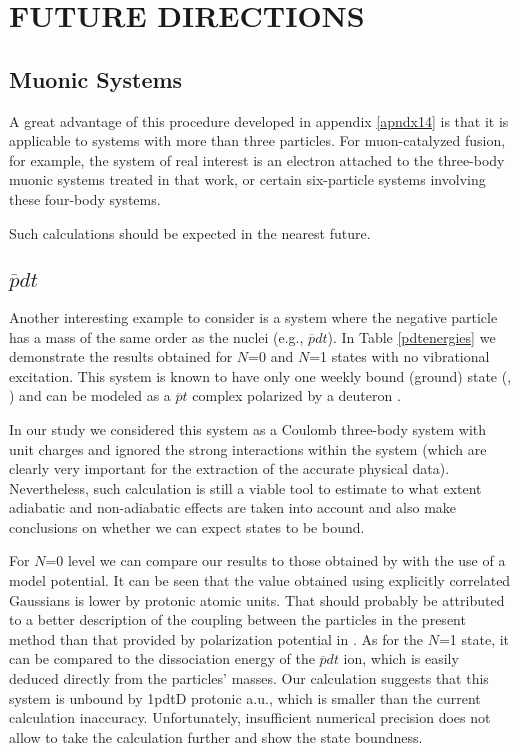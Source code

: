 \chapter{FUTURE DIRECTIONS\label{future}}

\section{Muonic Systems}

A great advantage of this procedure developed in appendix \ref{apndx14} 
is that it is applicable to systems with more than three particles. 
For muon-catalyzed fusion, 
for example, the system of real interest is an electron attached 
to the three-body muonic systems treated in that work, 
or certain six-particle systems involving these four-body systems.

Such calculations should be expected in the nearest future.

\section{$\overline{p}dt$}

Another interesting example to consider is a system where
the negative particle has a mass of the same order as the
nuclei (e.g., $\overline{p}dt$). In Table \ref{pdtenergies}
we demonstrate the results obtained for $N$=0 and $N$=1 
states with no vibrational excitation. This system is known
to have only one weekly bound (ground) state 
(\cite{pdt_N1_1}, \cite{pdt_N1_2}) and can be modeled as a
$\overline{p}t$ complex polarized by a deuteron \cite{frolov_pdt}.

In our study we considered this system as a Coulomb
three-body system with unit charges and ignored the 
strong interactions within the system (which are clearly
very important for the extraction of the accurate physical data).
Nevertheless, such calculation is still a viable tool
to estimate to what extent adiabatic and non-adiabatic effects
are taken into account and also make conclusions on 
whether we can expect states to be bound.
 
For $N$=0 level we can compare our results to those obtained
by \cite{frolov_pdt} with the use of a model potential.
It can be seen that the value obtained using explicitly 
correlated Gaussians is lower by \NpdtD  protonic atomic
units. That should probably be attributed to a better 
description of the coupling between the particles 
in the present method than that provided by polarization
potential in \cite{frolov_pdt}. As for the $N$=1 state,
it can be compared to the dissociation energy of the
$\overline{p}dt$ ion, which is easily deduced directly
from the particles' masses. Our calculation suggests that this
system is unbound by \N1pdtD protonic a.u., which
is smaller than the current calculation inaccuracy.
Unfortunately, insufficient numerical precision 
does not allow to take the calculation further and show
the state boundness. 

